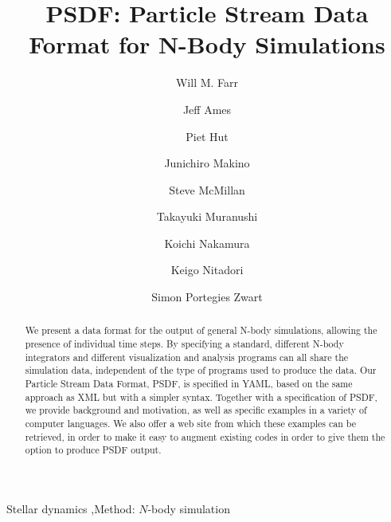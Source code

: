 \documentclass[5p,authoryear]{elsarticle}
\begin{document}
\title{PSDF: Particle Stream Data Format for N-Body Simulations}

\author[WMF]{Will M. Farr}
\author[JA]{Jeff Ames}
\author[PH]{Piet Hut}
\author[JM]{Junichiro Makino}
\author[SM]{Steve McMillan}
\author[TM]{Takayuki Muranushi}
\author[KN]{Koichi Nakamura}
\author[KN2]{Keigo Nitadori}
\author[SPZ]{Simon Portegies Zwart}


\address[WMF]{Northwestern University Center for Interdisciplinary
  Research in Astrophysics, 2145 Sheridan Rd., Evanston IL 60208 USA}

\address[JM]{Interactive Research Center of Science, Graduate
  School of Science and Engineering Tokyo Institute of Technology,
  2--12--1 Ookayama, Meguro, Tokyo 152-8551, Japan}

\address[PH]{Institute for Advanced Study, Princeton, NJ 08540, USA}

\address[TM]{The Hakubi Center, Kyoto University, Kitashirakawa Oiwakecho,
Sakyo-Ku, Kyoto, 606-8502, Japan}

\begin{abstract}
  We present a data format for the output of general N-body
  simulations, allowing the presence of individual time steps.  By
  specifying a standard, different N-body integrators and different
  visualization and analysis programs can all share the simulation
  data, independent of the type of programs used to produce the data.
  Our Particle Stream Data Format, PSDF, is specified in YAML, based
  on the same approach as XML but with a simpler syntax.  Together
  with a specification of PSDF, we provide background and motivation,
  as well as specific examples in a variety of computer languages.  We
  also offer a web site from which these examples can be retrieved, in
  order to make it easy to augment existing codes in order to give
  them the option to produce PSDF output.
\end{abstract}

\begin{keyword}
  Stellar dynamics \sep Method: $N$-body simulation
\end{keyword}

\maketitle
\end{document}
